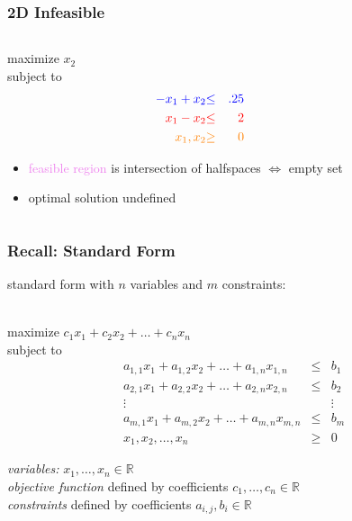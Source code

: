 \documentclass[10pt,aspectratio=169]{beamer}
\newcommand{\stanza}{ \\~\ }
\begin{document}
\begin{frame} \frametitle{2D Infeasible}
  \begin{columns}
    \begin{column}{0.4 \textwidth}
  maximize $x_2$ \\
  subject to
  \begin{eqnarray*}
    \textcolor{blue}{-x_1 + x_2} &\textcolor{blue}{\leq}& \textcolor{blue}{.25} \\
    \textcolor{red}{x_1 - x_2} &\textcolor{red}{\leq}& \textcolor{red}{2} \\
    \textcolor{orange}{x_1, x_2} &\textcolor{orange}{\geq}& \textcolor{orange}{0}
  \end{eqnarray*}
  \begin{itemize}
    \item \textcolor{violet}{feasible region} is intersection of halfspaces
     $\Leftrightarrow$ empty set
    \item optimal solution undefined
  \end{itemize}
  \end{column}
  \begin{column}{0.6 \textwidth}
    \begin{center}
  \end{center}
\end{column}
\end{columns}
\end{frame}

\begin{frame} \frametitle{Recall: Standard Form}
standard form with $n$ variables and $m$ constraints:\stanza

maximize $c_1 x_1 + c_2 x_2 + \ldots + c_n x_n$ \\
subject to
\begin{eqnarray*}
a_{1,1} x_1 + a_{1,2} x_2 + \ldots + a_{1, n} x_{1, n} &\leq& b_1 \\
a_{2,1} x_1 + a_{2,2} x_2 + \ldots + a_{2, n} x_{2, n} &\leq& b_2 \\
\vdots & & \vdots \\
a_{m,1} x_1 + a_{m,2} x_2 + \ldots + a_{m, n} x_{m, n} &\leq& b_m \\
x_1, x_2, \ldots, x_n &\geq& 0
\end{eqnarray*}

\emph{variables:} $x_1, \ldots, x_n \in \mathbb{R}$ \\
\emph{objective function} defined by coefficients $c_1, \ldots, c_n \in \mathbb{R}$ \\
\emph{constraints} defined by coefficients $a_{i,j}, b_i \in \mathbb{R}$
\end{frame}
\end{document}
